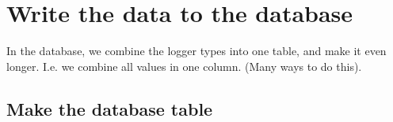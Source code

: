 \documentclass[]{article}
\newenvironment{Shaded}{\begin{snugshade}}{\end{snugshade}}
\newcommand{\DataTypeTok}[1]{\textcolor[rgb]{0.13,0.29,0.53}{#1}}
\newcommand{\KeywordTok}[1]{\textcolor[rgb]{0.13,0.29,0.53}{\textbf{#1}}}
\newcommand{\NormalTok}[1]{#1}
\newcommand{\OperatorTok}[1]{\textcolor[rgb]{0.81,0.36,0.00}{\textbf{#1}}}
\newcommand{\StringTok}[1]{\textcolor[rgb]{0.31,0.60,0.02}{#1}}
\begin{document}
\hypertarget{write-the-data-to-the-database}{%
\section{Write the data to the
database}\label{write-the-data-to-the-database}}

In the database, we combine the logger types into one table, and make it
even longer. I.e. we combine all values in one column. (Many ways to do
this).

\begin{Shaded}
\end{Shaded}

\hypertarget{make-the-database-table}{%
\subsection{Make the database table}\label{make-the-database-table}}
\end{document}
